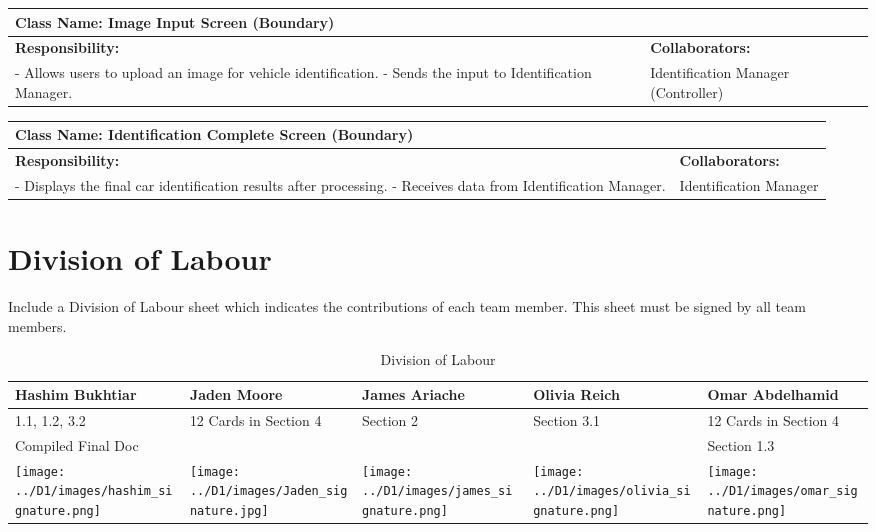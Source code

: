 \documentclass[]{article}
\begin{document}
\begin{table}[ht]
    \centering
    \begin{tabular}{|p{7cm}|p{7cm}|}
    \hline
     \multicolumn{2}{|l|}{\textbf{Class Name: Image Input Screen (Boundary)}} \\
    \hline
    \textbf{Responsibility:} & \textbf{Collaborators:} \\
    \hline
    - Allows users to upload an image for vehicle identification. \newline
    - Sends the input to Identification Manager.
    &
    Identification Manager (Controller) \\
    \hline
    \end{tabular}
\end{table}

\begin{table}[ht]
    \centering
    \begin{tabular}{|p{7cm}|p{7cm}|}
    \hline
     \multicolumn{2}{|l|}{\textbf{Class Name: Identification Complete Screen (Boundary)}} \\
    \hline
    \textbf{Responsibility:} & \textbf{Collaborators:} \\
    \hline
    - Displays the final car identification results after processing. \newline
    - Receives data from Identification Manager.
    &
    Identification Manager \\
    \hline
    \end{tabular}
\end{table}



\clearpage
\appendix
\section{Division of Labour}
\label{sec:division_of_labour}
Include a Division of Labour sheet which indicates the contributions of each team member. This sheet must be signed by all team members.
\begin{table}[h!]
\centering
\begin{tabular}{|p{3cm}|p{3.5cm}|p{3cm}|p{3cm}|p{3.5cm}|}
\hline
Hashim Bukhtiar & Jaden Moore & James Ariache & Olivia Reich & Omar Abdelhamid \\ \hline
1.1, 1.2, 3.2 & 12 Cards in Section 4 & Section 2 & Section 3.1 & 12 Cards in Section 4 \\ 
Compiled Final Doc &  &  &  & Section 1.3 \\
\texttt{[image: ../D1/images/hashim\_signature.png]} & \texttt{[image: ../D1/images/Jaden\_signature.jpg]} &
\texttt{[image: ../D1/images/james\_signature.png]}& \texttt{[image: ../D1/images/olivia\_signature.png]} & \texttt{[image: ../D1/images/omar\_signature.png]}  \\
\hline
\end{tabular}
\caption{Division of Labour} 
\label{tab:division_of_labour}
\end{table}
\end{document}
